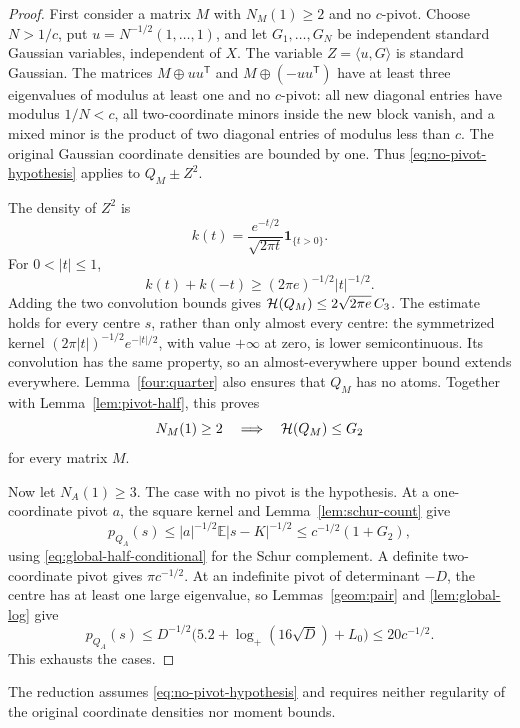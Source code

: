 \begin{proof}
First consider a matrix \(M\) with \(N_M(1)\geq2\) and no
\(c\)-pivot.  Choose \(N>1/c\), put
\(u=N^{-1/2}(1,\ldots,1)\), and let \(G_1,\ldots,G_N\) be
independent standard Gaussian variables, independent of \(X\).
The variable \(Z=\langle u,G\rangle\) is standard Gaussian.
The matrices \(M\oplus uu^{\mathsf T}\) and
\(M\oplus(-uu^{\mathsf T})\) have at least three eigenvalues
of modulus at least one and no \(c\)-pivot: all new diagonal
entries have modulus \(1/N<c\), all two-coordinate minors
inside the new block vanish, and a mixed minor is the product
of two diagonal entries of modulus less than \(c\).
The original Gaussian coordinate densities are bounded by one.
Thus \eqref{eq:no-pivot-hypothesis} applies to \(Q_M\pm Z^2\).

The density of \(Z^2\) is
\[
 k(t)=\frac{e^{-t/2}}{\sqrt{2\pi t}}\boldsymbol1_{\{t>0\}}.
\]
For \(0<|t|\leq1\),
\[
 k(t)+k(-t)\geq(2\pi e)^{-1/2}|t|^{-1/2}.
\]
Adding the two convolution bounds gives
\({\cal H}(Q_M)\leq2\sqrt{2\pi e}\,C_3\).
The estimate holds for every centre \(s\), rather than only
almost every centre: the symmetrized kernel
\((2\pi|t|)^{-1/2}e^{-|t|/2}\), with value \(+\infty\) at zero,
is lower semicontinuous.  Its convolution has the same property,
so an almost-everywhere upper bound extends everywhere.
Lemma~\ref{four:quarter} also ensures that \(Q_M\) has no atoms.
Together with Lemma~\ref{lem:pivot-half}, this proves
\begin{equation}
 N_M(1)\geq2\quad\Longrightarrow\quad {\cal H}(Q_M)\leq G_2
 \label{eq:global-half-conditional}
\end{equation}
for every matrix \(M\).

Now let \(N_A(1)\geq3\).  The case with no pivot is the
hypothesis.  At a one-coordinate pivot \(a\), the square
kernel and Lemma~\ref{lem:schur-count} give
\[
 p_{Q_A}(s)\leq |a|^{-1/2}\mathbb E|s-K|^{-1/2}
 \leq c^{-1/2}(1+G_2),
\]
using \eqref{eq:global-half-conditional} for the Schur
complement.  A definite two-coordinate pivot gives
\(\pi c^{-1/2}\).  At an indefinite pivot of determinant
\(-D\), the centre has at least one large eigenvalue, so
Lemmas~\ref{geom:pair} and \ref{lem:global-log} give
\[
 p_{Q_A}(s)\leq
 D^{-1/2}\bigl(5.2+\log_+(16\sqrt D)+L_0\bigr)
 \leq20c^{-1/2}.
\]
This exhausts the cases.
\end{proof}

\begin{remark}
The reduction assumes \eqref{eq:no-pivot-hypothesis} and requires
neither regularity of the original coordinate densities nor moment
bounds.
\end{remark}

